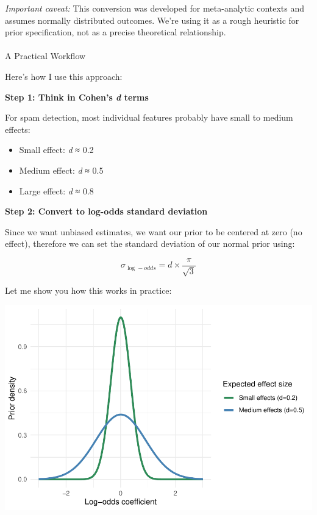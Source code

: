 \documentclass[
  letterpaper,
  DIV=11,
  numbers=noendperiod]{scrartcl}
\makeatletter
\let\oldparagraph\paragraph
\renewcommand{\paragraph}{
    \@ifstar
      \xxxParagraphStar
      \xxxParagraphNoStar
  }
\newcommand{\xxxParagraphStar}[1]{\oldparagraph*{#1}\mbox{}}
\newcommand{\xxxParagraphNoStar}[1]{\oldparagraph{#1}\mbox{}}
\makeatother
\begin{document}
\emph{Important caveat:} This conversion was developed for meta-analytic
contexts and assumes normally distributed outcomes. We're using it as a
rough heuristic for prior specification, not as a precise theoretical
relationship.

\paragraph{A Practical Workflow}\label{a-practical-workflow}

Here's how I use this approach:

\textbf{Step 1: Think in Cohen's \emph{d} terms}

For spam detection, most individual features probably have small to
medium effects:

\begin{itemize}
\item
  Small effect: \emph{d} ≈ 0.2
\item
  Medium effect: \emph{d} ≈ 0.5
\item
  Large effect: \emph{d} ≈ 0.8
\end{itemize}

\textbf{Step 2: Convert to log-odds standard deviation}

Since we want unbiased estimates, we want our prior to be centered at
zero (no effect), therefore we can set the standard deviation of our
normal prior using:

\[\sigma_{\log-odds} = d \times \frac{\pi}{\sqrt{3}}\]

Let me show you how this works in practice:

\begin{center}
\includegraphics[width=0.8\linewidth,height=\textheight,keepaspectratio]{Beyond!!!_files/figure-pdf/prior-setup-1.pdf}
\end{center}
\end{document}
